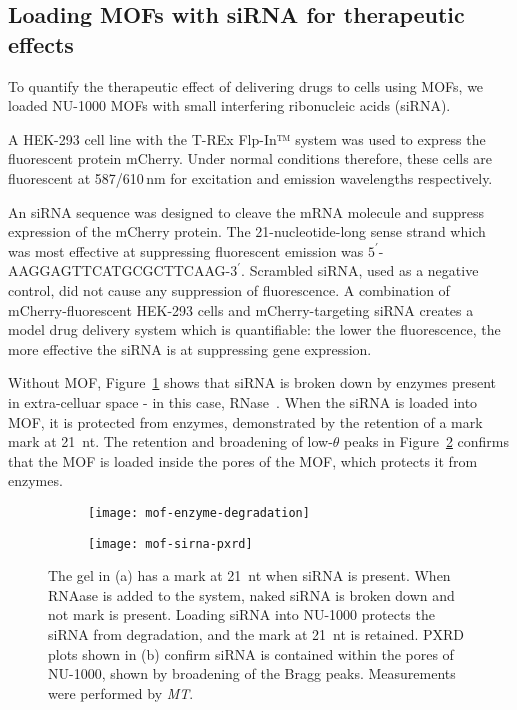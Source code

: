 \subsection{Loading MOFs with siRNA for therapeutic effects} \label{sec:MOF-siRNA}
To quantify the therapeutic effect of delivering drugs to cells using MOFs, we loaded NU-1000 MOFs with small interfering ribonucleic acids (siRNA). 

A HEK-293 cell line with the T-REx Flp-In™ system was used to express the fluorescent protein mCherry. 
Under normal conditions therefore, these cells are fluorescent at 587/610\,\si{\nano\meter} for excitation and emission wavelengths respectively. 

An siRNA sequence was designed to cleave the mRNA molecule and suppress expression of the mCherry protein.
The 21-nucleotide-long sense strand which was most effective at suppressing fluorescent emission was $5^\prime$-AAGGAGTTCATGCGCTTCAAG-$3^\prime$. 
Scrambled siRNA, used as a negative control, did not cause any suppression of fluorescence.
A combination of mCherry-fluorescent HEK-293 cells and mCherry-targeting siRNA creates a model drug delivery system which is quantifiable: the lower the fluorescence, the more effective the siRNA is at suppressing gene expression. 

Without MOF, Figure~\ref{fig:mof-enzyme-degradation} shows that siRNA is broken down by enzymes present in extra-celluar space - in this case, RNase~\cite{chirgwin1979isolation}.
When the siRNA is loaded into MOF, it is protected from enzymes, demonstrated by the retention of a mark mark at \SI{21}{nt}. 
The retention and broadening of low-$\theta$ peaks in Figure~\ref{fig:mof-sirna-pxrd} confirms that the MOF is loaded inside the pores of the MOF, which protects it from enzymes. 

\begin{figure}[htbp!]
	\centering
	\begin{subfigure}[b]{0.49\textwidth}
		\texttt{[image: mof-enzyme-degradation]}
		\caption{} \label{fig:mof-enzyme-degradation}
	\end{subfigure}
	\hfill
	\begin{subfigure}[b]{0.49\textwidth}
		\texttt{[image: mof-sirna-pxrd]}
		\caption{} \label{fig:mof-sirna-pxrd}
	\end{subfigure}			
	\caption[MOFs: NU-1000 protects siRNA from degradation by enzymes in extracellular space]{The gel in (a) has a mark at \SI{21}{nt} when siRNA is present. When RNAase is added to the system, naked siRNA is broken down and not mark is present. Loading siRNA into NU-1000 protects the siRNA from degradation, and the mark at \SI{21}{nt} is retained. PXRD plots shown in (b) confirm siRNA is contained within the pores of NU-1000, shown by broadening of the Bragg peaks. Measurements were performed by \textit{MT}. }
\label{fig:mof-enzyme-pxrd}
\end{figure}

